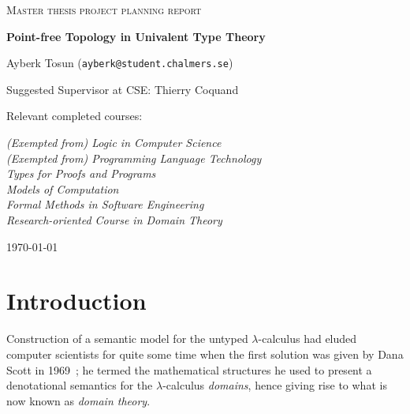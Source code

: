 \documentclass{article}
\begin{document}
\begin{titlepage}

\centering
  
{\scshape\LARGE Master thesis project planning report\\}
  
\vspace{0.5cm}
  
{\huge\bfseries Point-free Topology in Univalent Type Theory\\}
  
\vspace{2cm}

{\Large Ayberk Tosun (\texttt{ayberk@student.chalmers.se})\\}
  
\vspace{1.0cm}
  
{\large Suggested Supervisor at CSE: Thierry Coquand\\}
  
\vspace{1.5cm}
  
{\large Relevant completed courses:\\}
  
{\itshape (Exempted from) Logic in Computer Science\\}
{\itshape (Exempted from) Programming Language Technology\\}
{\itshape Types for Proofs and Programs\\}
{\itshape Models of Computation\\}
{\itshape Formal Methods in Software Engineering\\}
{\itshape Research-oriented Course in Domain Theory\\}
  
\vfill

\vfill
  
{\large \today\\} 

\end{titlepage}

\section{Introduction}

Construction of a semantic model for the untyped $\lambda$-calculus had eluded computer
scientists for quite some time when the first solution was given by Dana Scott in
1969~\cite{scott:1969}; he termed the mathematical structures he used to present a
denotational semantics for the $\lambda$-calculus \emph{domains}, hence giving rise to what is
now known as \emph{domain theory}.
\end{document}
